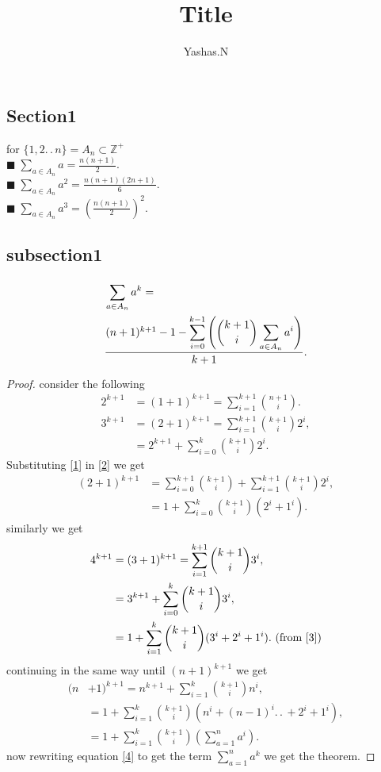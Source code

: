 \documentclass[11pt]{extarticle}
\author{Yashas.N}
\title{Title}
\date{}
\newcommand{\Z}{\mathbb{Z}}
\newcommand{\ck}{.\,.\,}
\newcommand{\sm}[2]{\displaystyle\sum_{#1}^{#2}}
\newcommand{\tbx}[2][]{
\begin{tcolorbox}[enhanced,breakable,size=small,colback=black!2!white,title={#1},arc is angular, arc=1.5mm,drop fuzzy shadow]
	#2
\end{tcolorbox}
}
\newcommand{\y}{$\blacksquare\;$}
\begin{document}
    \maketitle
    \boldmath
\begin{multicols}{2}
    \section{Section1}
    \tbx[Point1]{for $\{1,2\ck n \}=A_n\subset \Z^+  $ \\
    \y $ \sm{a\in A_n}{} a=\frac{ n(n+1) }{2} .  $\\
    \y $ \sm{a\in A_n}{} a^2 =\frac{n(n+1)(2n+1)}{6}.$  \\
    \y  $ \sm{a\in A_n}{} a^3 =\left(\frac{n(n+1)}{2}\right)^2.$   }
    
    \subsection{subsection1}
\tbx[Theorem]{ 	\begin{align*}\small
		&\sm{a\in A_n}{} a^k =\\
		&  \frac{ (n+1)^{k+1}-1-\sm{i=0}{k-1}\left({k+1\choose i}\sm{a\in A_n}{}a^{i}\right)}{{k+1}}.
		\end{align*}      } 
\begin{proof}

consider the following\\
\begin{align}
	2^{k+1}&= (1+1)^{k+1}=\sm{i=1}{k+1}{n+1\choose i}.\label{1}\\
	3^{k+1}&= (2+1)^{k+1}=\sm{i=1}{k+1}{k+1\choose i}2^i, \nonumber\\
	&=2^{k+1}+\sm{i=0}{k}{k+1\choose i}2^i.  \label{2}
\end{align}
Substituting \eqref{1} in \eqref{2} we get 
\begin{align}
	(2+1)^{k+1}&=\sm{i=0}{k+1}{k+1\choose i}+\sm{i=1}{k+1}{k+1\choose i}2^i, \nonumber\\
	&= 1+\sm{i=0}{k}{k+1\choose i}(2^i+1^i).\label{3}
\end{align}
similarly we get 
\begin{align*}
	4^{k+1}&=(3+1)^{k+1}=\sm{i=1}{k+1}{k+1\choose i}3^i,\\
	&= 3^{k+1}+\sm{i=0}{k}{k+1\choose i}3^i, \\
	&= 1+\sm{i=1}{k}{k+1\choose i}(3^i+2^i+1^i). \text{ (from \eqref{3})}
\end{align*}
continuing in the same way until $ (n+1)^{k+1} $ we get
\begin{align}
	(n&+1)^{k+1}=n^{k+1}+\sm{i=1}{k}{k+1\choose i}n^i,\nonumber\\
	&= 1+\sm{i=1}{k}{k+1\choose i}(n^i+(n-1)^i\ck +2^i+1^i),\nonumber\\
	&=1+\sm{i=1}{k}{k+1\choose i}\left(\sm{a=1}{n}a^i\right).\label{4}
\end{align}
now rewriting equation \eqref{4} to get the term $ \sm{a=1}{n}a^k $ we get the theorem.
\end{proof}
    
\end{multicols}
\end{document}
